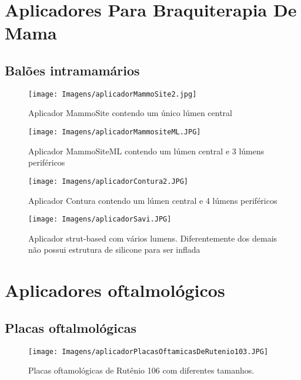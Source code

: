 \documentclass[11pt,a4paper]{article}
\begin{document}
    \section{Aplicadores Para Braquiterapia De Mama}

        \subsection{Balões intramamários}

            \begin{figure}[h]
                \centering
                \texttt{[image: Imagens/aplicadorMammoSite2.jpg]}
                \caption{Aplicador MammoSite contendo um único lúmen central}
            \end{figure}

            \begin{figure}[h]
                \centering
                \texttt{[image: Imagens/aplicadorMammositeML.JPG]}
                \caption{Aplicador MammoSiteML contendo um lúmen central e 3 lúmens periféricos}
            \end{figure}

            \begin{figure}[h]
                \centering
                \texttt{[image: Imagens/aplicadorContura2.JPG]}
                \caption{Aplicador Contura contendo um lúmen central e 4 lúmens periféricos}
            \end{figure}

            \begin{figure}[h]
                \centering
                \texttt{[image: Imagens/aplicadorSavi.JPG]}
                \caption{Aplicador strut-based com vários lumens. Diferentemente dos demais não possui estrutura de silicone para ser inflada}
            \end{figure}


    \pagebreak
    \section{Aplicadores oftalmológicos}
            
        \subsection{Placas oftalmológicas}
            
            \begin{figure}[h]
                \centering
                \texttt{[image: Imagens/aplicadorPlacasOftamicasDeRutenio103.JPG]}
                \caption{Placas oftamológicas de Rutênio 106 com diferentes tamanhos.}
            \end{figure}
\end{document}
